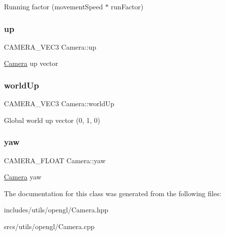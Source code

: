 Running factor (movement\+Speed $\ast$ run\+Factor) \mbox{\label{class_camera_a02d03a426815c0d64522724fbe2374ca}} 
\subsubsection{\texorpdfstring{up}{up}}
{\footnotesize\ttfamily C\+A\+M\+E\+R\+A\+\_\+\+V\+E\+C3 Camera\+::up}

\hyperlink{class_camera}{Camera} up vector \mbox{\label{class_camera_a9088ff173e443938f31ed4b6c0f75756}} 
\subsubsection{\texorpdfstring{world\+Up}{worldUp}}
{\footnotesize\ttfamily C\+A\+M\+E\+R\+A\+\_\+\+V\+E\+C3 Camera\+::world\+Up}

Global world up vector (0, 1, 0) \mbox{\label{class_camera_aa11a0643425580b4115bb9b839542891}} 
\subsubsection{\texorpdfstring{yaw}{yaw}}
{\footnotesize\ttfamily C\+A\+M\+E\+R\+A\+\_\+\+F\+L\+O\+AT Camera\+::yaw}

\hyperlink{class_camera}{Camera} yaw 

The documentation for this class was generated from the following files\+:\begin{DoxyCompactItemize}
\item 
includes/utils/opengl/Camera.\+hpp\item 
srcs/utils/opengl/Camera.\+cpp\end{DoxyCompactItemize}
